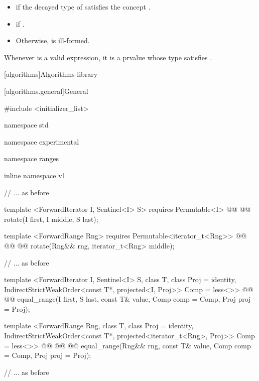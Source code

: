 \begin{itemize}
\item {} if the decayed type of 
satisfies the concept .
\item {} if .
\item Otherwise,  is ill-formed.
\end{itemize}

\remark Whenever  is a valid expression, it is a prvalue
whose type satisfies .

[algorithms]{Algorithms library}


[algorithms.general]{General}


\begin{codeblock}
#include <initializer_list>

namespace std { namespace experimental { namespace ranges { inline namespace v1 {
  // ... as before

  template <ForwardIterator I, Sentinel<I> S>
    requires Permutable<I>
    @@
    @@
      rotate(I first, I middle, S last);

  template <ForwardRange Rng>
    requires Permutable<iterator_t<Rng>>
    @@
                @@
    @@
      rotate(Rng&& rng, iterator_t<Rng> middle);

  // ... as before

  template <ForwardIterator I, Sentinel<I> S, class T, class Proj = identity,
      IndirectStrictWeakOrder<const T*, projected<I, Proj>> Comp = less<>>
    @@
    @@
      equal_range(I first, S last, const T& value, Comp comp = Comp{}, Proj proj = Proj{});

  template <ForwardRange Rng, class T, class Proj = identity,
      IndirectStrictWeakOrder<const T*, projected<iterator_t<Rng>, Proj>> Comp = less<>>
    @@
                @@
    @@
      equal_range(Rng&& rng, const T& value, Comp comp = Comp{}, Proj proj = Proj{});

  // ... as before
}}}}
\end{codeblock}

